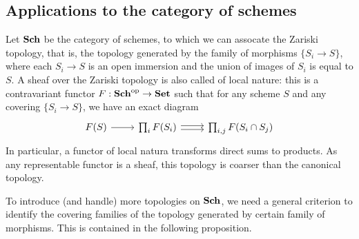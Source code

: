 \subsection{Applications to the category of schemes}\label{site topology on Sch subsection}
Let $\mathbf{Sch}$ be the category of schemes, to which we can assocate the Zariski topology, that is, the topology generated by the family of morphisms $\{S_i\to S\}$, where each $S_i\to S$ is an open immersion and the union of images of $S_i$ is equal to $S$. A sheaf over the Zariski topology is also called of local nature: this is a contravariant functor $F:\mathbf{Sch}^{\mathrm{op}}\to\mathbf{Set}$ such that for any scheme $S$ and any covering $\{S_i\to S\}$, we have an exact diagram
\[\begin{tikzcd}
F(S)\ar[r]&\prod_iF(S_i)\ar[r,shift left=2pt]\ar[r,shift right=2pt]&\prod_{i,j}F(S_i\cap S_j)
\end{tikzcd}\]
In particular, a functor of local natura transforms direct sums to products. As any representable functor is a sheaf, this topology is coarser than the canonical topology.\par
To introduce (and handle) more topologies on $\mathbf{Sch}$, we need a general criterion to identify the covering families of the topology generated by certain family of morphisms. This is contained in the following proposition.
